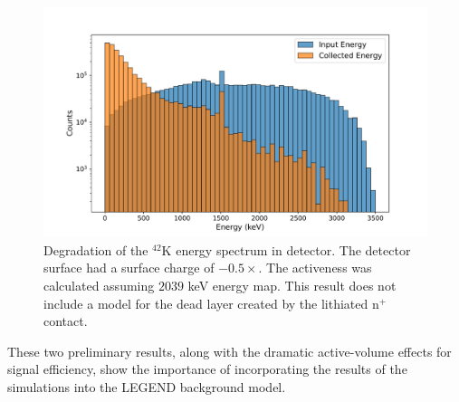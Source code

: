 \begin{figure}%
  \centering
  \includegraphics[trim={1.5cm 0.0cm 2cm 1.76cm},clip,width=0.99\linewidth]{ch5/figs/k_42_beta_spectrum.pdf}
  \caption{Degradation of the $^{42}$K energy spectrum in {\ponama} detector. The detector surface had a surface charge of $- 0.5\times${\scunit}. The activeness was calculated assuming $2039$ keV energy map. This result does not include a model for the dead layer created by the lithiated n$^+$ contact.}
  \label{ch5_figs_k_42_degrad}
\end{figure}

These two preliminary results, along with the dramatic active-volume effects for {\onbb} signal efficiency, show the importance of incorporating the results of the {\ehd} simulations into the LEGEND background model.